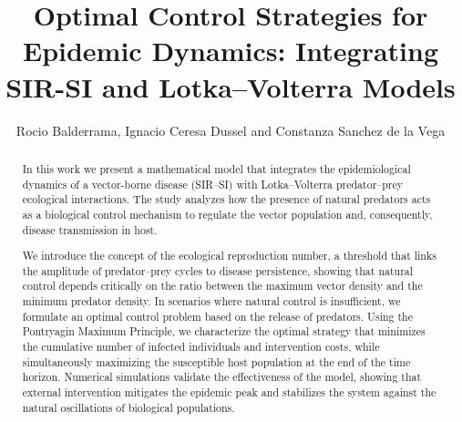 \documentclass{amsart}
\theoremstyle{definition}
\theoremstyle{remark}
\numberwithin{equation}{section}
\begin{document}
	\title{Optimal Control Strategies for Epidemic Dynamics: Integrating SIR-SI and Lotka--Volterra Models}
	
	\author{Rocio Balderrama, Ignacio Ceresa Dussel and Constanza Sanchez de la Vega}
	
	\address[Rocio Balderrama]{Instituto de Investigaciones Matemáticas Luis A. Santaló (IMAS--CONICET), Departamento de Matemática, Facultad de Ciencias Exactas y Naturales,
		Universidad de Buenos Aires, Ciudad Universitaria, Buenos Aires, Argentina}
	\address[Ignacio Ceresa Dussel]{Instituto de Investigaciones Matemáticas Luis A. Santaló (IMAS--CONICET), Departamento de Matemática, Facultad de Ciencias Exactas y Naturales,
		Universidad de Buenos Aires, Ciudad Universitaria, Buenos Aires, Argentina}
	
	\address[Constanza Sanchez de la Vega]{Instituto de Cálculo, CONICET,
		Departamento de Matemática, Facultad de Ciencias Exactas y Naturales,
		Universidad de Buenos Aires, Ciudad Universitaria, Buenos Aires, Argentina}
	
	\subjclass[2020]{}
	
	
	
	\begin{abstract}
		In this work we present a mathematical model that integrates the epidemiological dynamics of a vector-borne disease (SIR–SI) with Lotka--Volterra predator–prey ecological interactions. The study analyzes how the presence of natural predators acts as a biological control mechanism to regulate the vector population and, consequently, disease transmission in host. 
		
		We introduce the concept of the ecological reproduction number, a threshold that links the amplitude of predator--prey cycles to disease persistence, showing that natural control depends critically on the ratio between the maximum vector density and the minimum predator density. In scenarios where natural control is insufficient, we formulate an optimal control problem based on the release of predators. Using the Pontryagin Maximum Principle, we characterize the optimal strategy that minimizes the cumulative number of infected individuals and intervention costs, while simultaneously maximizing the susceptible host population at the end of the time horizon. Numerical simulations validate the effectiveness of the model, showing that external intervention mitigates the epidemic peak and stabilizes the system against the natural oscillations of biological populations.
		
	\end{abstract}
	\maketitle
		
\end{document}
